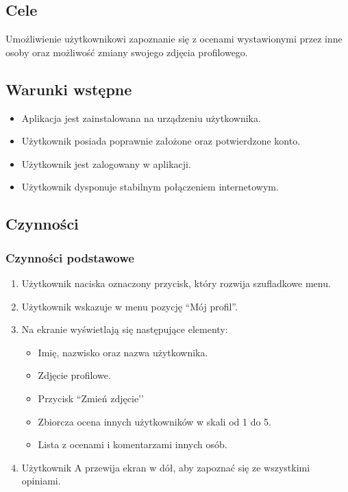 \documentclass[12pt,a4paper,twoside]{article}
\begin{document}
    \subsection{Cele}
    Umożliwienie użytkownikowi zapoznanie się z ocenami wystawionymi przez inne osoby oraz możliwość zmiany swojego zdjęcia profilowego.


    \subsection{Warunki wstępne}
    \begin{itemize}
        \item Aplikacja jest zainstalowana na urządzeniu użytkownika.
        \item Użytkownik posiada poprawnie założone oraz potwierdzone konto.
        \item Użytkownik jest zalogowany w aplikacji.
        \item Użytkownik dysponuje stabilnym połączeniem internetowym.
    \end{itemize}

    \subsection{Czynności}

    \subsubsection{Czynności podstawowe}

    \begin{enumerate}
        \item Użytkownik naciska oznaczony przycisk, który rozwija szufladkowe menu.
        \item Użytkownik wskazuje w menu pozycję ``Mój profil''.
        \item Na ekranie wyświetlają się następujące elementy:
        \begin{itemize}
            \item Imię, nazwisko oraz nazwa użytkownika.
            \item Zdjęcie profilowe.
            \item Przycisk ``Zmień zdjęcie’’
            \item Zbiorcza ocena innych użytkowników w skali od 1 do 5.
            \item Lista z ocenami i komentarzami innych osób.
        \end{itemize}
        \item Użytkownik A przewija ekran w dół, aby zapoznać się ze wszystkimi opiniami.
    \end{enumerate}
\end{document}
